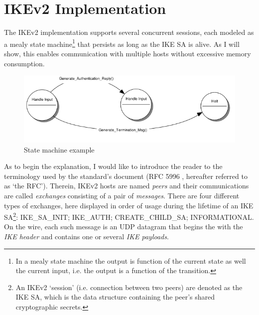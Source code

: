 \documentclass[final,a4paper,twoside,11pt,onecolumn]{report}
\begin{document}
% 
% 
% 
% 

\section{IKEv2 Implementation}
The IKEv2 implementation supports several concurrent sessions, each modeled as a mealy state machine\footnote{In a mealy state machine the output is function of the current state as well the current input, i.e. the output is a function of the transition.} that persists as long as the IKE SA is alive. As I will show, this enables communication with multiple hosts without excessive memory consumption.

\begin{figure}[h!]
   \includegraphics[width=1.0\textwidth]{fsm/mealy_demo}
   \caption{State machine example}
   \label{fig:mealydemo}
\end{figure}

As to begin the explanation, I would like to introduce the reader to the terminology used by the standard's document (RFC 5996 \cite{rfc5996}, hereafter referred to as `the RFC'). Therein, IKEv2 hosts are named \emph{peers} and their communications are called \emph{exchanges} consisting of a pair of \emph{messages}. There are four different types of exchanges, here displayed in order of usage during the lifetime of an IKE SA\footnote{An IKEv2 `session' (i.e. connection between two peers) are denoted as the IKE SA, which is the data structure containing the peer's shared cryptographic secrets.}: IKE\_SA\_INIT; IKE\_AUTH; CREATE\_CHILD\_SA; INFORMATIONAL. On the wire, each such message is an UDP datagram that begins the with the \emph{IKE header} and contains one or several \emph{IKE payloads}.
\end{document}
